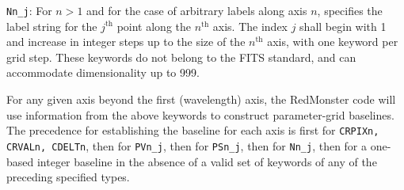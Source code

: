 \documentclass[12pt]{article}
\begin{document}
\noindent \texttt{Nn\_j}: For $n > 1$ and for the case of arbitrary labels
along axis $n$, specifies the label string for the $j^{\mathrm{th}}$
point along the $n^{\mathrm{th}}$ axis.
The index $j$ shall begin with 1 and increase in integer steps up to the
size of the $n^{\mathrm{th}}$ axis, with one keyword per grid step.
These keywords do not belong to the FITS standard,
and can accommodate dimensionality up to 999.

For any given axis beyond the first (wavelength) axis, the
RedMonster code will use information from the above keywords
to construct parameter-grid baselines.  The precedence
for establishing the baseline for each axis is
first for \texttt{CRPIXn, CRVALn, CDELTn}, then for
\texttt{PVn\_j}, then for \texttt{PSn\_j}, then
for \texttt{Nn\_j}, then for a one-based integer baseline
in the absence of a valid set of keywords of any of the preceding
specified types.
\end{document}
